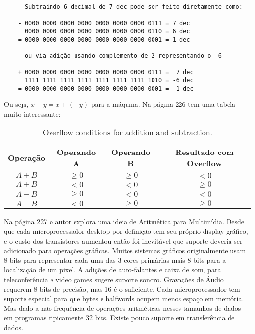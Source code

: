 \documentclass{article}
\begin{document}
\begin{enumerate}
  \begin{verbatim}
      Subtraindo 6 decimal de 7 dec pode ser feito diretamente como:
    
    - 0000 0000 0000 0000 0000 0000 0000 0111 = 7 dec
      0000 0000 0000 0000 0000 0000 0000 0110 = 6 dec
    = 0000 0000 0000 0000 0000 0000 0000 0001 = 1 dec
    
      ou via adição usando complemento de 2 representando o -6
    
    + 0000 0000 0000 0000 0000 0000 0000 0111 =  7 dec
      1111 1111 1111 1111 1111 1111 1111 1010 = -6 dec
    = 0000 0000 0000 0000 0000 0000 0000 0001 =  1 dec
  \end{verbatim}

Ou seja, $x-y = x+(-y)$ para a máquina.
Na página 226 tem uma tabela muito interessante:

  \begin{table}[ht!]
    \centering
    \begin{tabular}{|c|c|c|c|}
      \hline Operação & Operando A & Operando B & Resultado com Overflow \\
      \hline $A+B$ & $\ge 0$ & $\ge 0$ & $< 0$ \\
      \hline $A+B$ & $< 0$ & $< 0$ & $\ge 0$ \\
      \hline $A-B$ & $\ge 0$ & $< 0$ & $< 0$ \\
      \hline $A-B$ & $< 0$ & $\ge 0$ & $\ge 0$ \\
      \hline
    \end{tabular}
    \caption{Overflow conditions for addition and subtraction.}
  \end{table}

Na página 227 o autor explora uma ideia de Aritmética para Multimídia. Desde 
que cada microprocessador desktop por definição tem seu próprio display 
gráfico, e o custo dos transistores aumentou então foi inevitável que suporte 
deveria ser adicionado para operações gráficas. Muitos sistemas gráficos 
originalmente usam 8 bits para representar cada uma das 3 cores primárias mais 
8 bits para a localização de um pixel. A adições de auto-falantes e caixa de 
som, para teleconferência e video games sugere suporte sonoro. Gravações de 
Áudio requerem 8 bits de precisão, mas 16 é o suficiente. Cada microprocessador 
tem suporte especial para que bytes e halfwords ocupem menos espaço em memória. 
Mas dado a não frequência de operações aritméticas nesses tamanhos de dados em 
programas tipicamente 32 bits. Existe pouco suporte em transferência de dados.


\end{enumerate}
\end{document}

